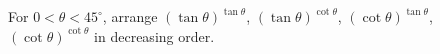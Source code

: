 For $0<\theta<45^\circ$, arrange $(\tan\theta)^{\tan\theta}$, $(\tan\theta)^{\cot\theta}$, $(\cot\theta)^{\tan\theta}$, $(\cot\theta)^{\cot\theta}$ in decreasing order.
